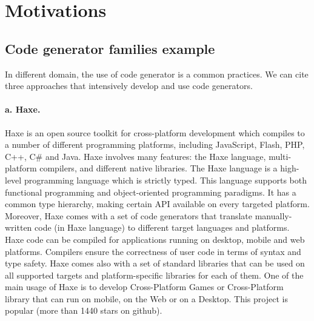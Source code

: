 
\section{Motivations}

\subsection{Code generator families example}

In different domain, the use of code generator is a common practices. We can cite three approaches that intensively develop and use code generators. 

\paragraph{a. Haxe.} 	Haxe is an open source toolkit for cross-platform development which compiles to a number of different programming platforms, including JavaScript, Flash, PHP, C++, C\# and Java. Haxe involves many features: the Haxe language, multi-platform compilers, and different native libraries. The Haxe language is a high-level programming language which is strictly typed. This language supports both functional programming and object-oriented programming paradigms. It has a common type hierarchy, making certain API available on every targeted platform. Moreover, Haxe comes with a set of code generators that translate manually-written code (in Haxe language) to different target languages and platforms.  Haxe code can be compiled for applications running on desktop, mobile and web platforms. Compilers ensure the correctness of user code in terms of syntax and type safety. Haxe comes also with a set of standard libraries that can be used on all supported targets and platform-specific libraries for each of them. One of the main usage of Haxe is to develop Cross-Platform Games or Cross-Platform library that can run on mobile, on the Web or on a Desktop.  	This project is popular (more than 1440 stars on github).

